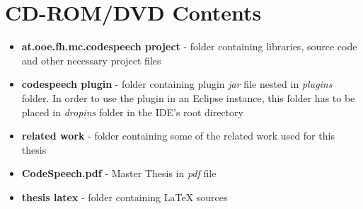 \chapter{CD-ROM/DVD Contents}
\label{app:cdrom}

\begin{itemize}
    \item \textbf{at.ooe.fh.mc.codespeech project} - folder containing libraries, source code and other necessary project files
    \item \textbf{codespeech plugin} - folder containing plugin \textit{jar} file nested in \textit{plugins} folder. In order to use the plugin in an Eclipse instance, this folder has to be placed in \textit{dropins} folder in the IDE's root directory
    \item \textbf{related work} - folder containing some of the related work used for this thesis
    \item \textbf{CodeSpeech.pdf} - Master Thesis in \textit{pdf} file
    \item \textbf{thesis latex} - folder containing LaTeX sources
\end{itemize}